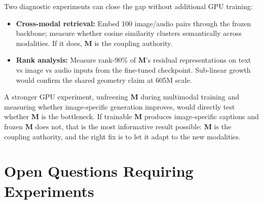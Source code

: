 \documentclass[11pt, a4paper]{article}
\newcommand{\M}{\mathbf{M}}
\theoremstyle{plain}
\theoremstyle{remark}
\begin{document}
Two diagnostic experiments can close the gap without additional GPU training:
\begin{itemize}[nosep]
    \item \textbf{Cross-modal retrieval:}  Embed 100 image/audio pairs through the frozen backbone; measure whether cosine similarity clusters semantically across modalities.  If it does, $\M$ is the coupling authority.
    \item \textbf{Rank analysis:}  Measure rank-90\% of $\M$'s residual representations on text vs image vs audio inputs from the fine-tuned checkpoint.  Sub-linear growth would confirm the shared geometry claim at 605M scale.
\end{itemize}

A stronger GPU experiment, unfreezing $\M$ during multimodal training and measuring whether image-specific generation improves, would directly test whether $\M$ is the bottleneck.
If trainable $\M$ produces image-specific captions and frozen $\M$ does not, that is the most informative result possible: $\M$ is the coupling authority, and the right fix is to let it adapt to the new modalities.

\section{Open Questions Requiring Experiments}
\end{document}
